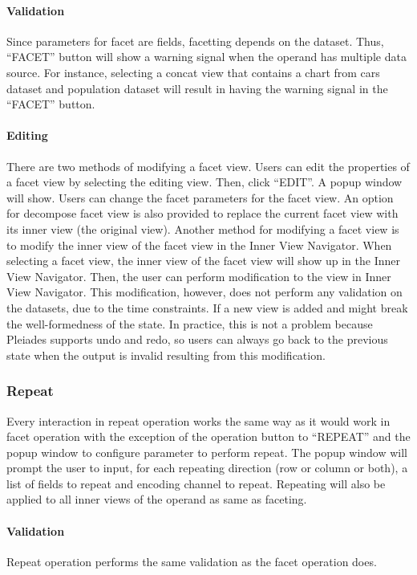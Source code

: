 \documentclass[journal]{vgtc}                %
\begin{document}
\paragraph{Validation} Since parameters for facet are fields, facetting
depends on the dataset. Thus, “FACET” button will show a warning signal when the
operand has multiple data source. For instance, selecting a concat view that
contains a chart from cars dataset and population dataset will result in having
the warning signal in the “FACET”  button.

\paragraph{Editing} There are two methods of modifying a facet view. Users can
edit the properties of a facet view by selecting the editing view. Then, click
“EDIT”. A popup window will show. Users can change the facet parameters for the
facet view. An option for decompose facet view is also provided to replace the
current facet view with its inner view (the original view). Another method for
modifying a facet view is to modify the inner view of the facet view in the Inner
View Navigator. When selecting a facet view, the inner view of the facet view will
show up in the Inner View Navigator. Then, the user can perform modification to the
view in Inner View Navigator. This modification, however, does not perform any
validation on the datasets, due to the time constraints. If a new view is added
and might break the well-formedness of the state. In practice, this is not a problem
because Pleiades supports undo and redo, so users can always go back to the previous
state when the output is invalid resulting from this modification.

\subsubsection{Repeat}
Every interaction in repeat operation works the same way as it would work in
facet operation with the exception of the operation button to “REPEAT” and the
popup window to configure parameter to perform repeat. The popup window will prompt
the user to input, for each repeating direction (row or column or both), a list of
fields to repeat and encoding channel to repeat. Repeating will also be applied to
all inner views of the operand as same as faceting.

\paragraph{Validation} Repeat operation performs the same validation as the facet
operation does.
\end{document}

